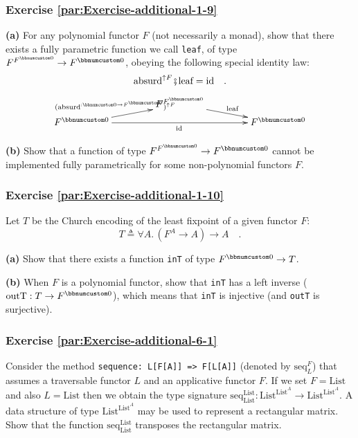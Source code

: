 \subsubsection{Exercise \label{par:Exercise-additional-1-9}\ref{par:Exercise-additional-1-9}}

\textbf{(a)} For any polynomial functor $F$ (not necessarily a monad),
show that there exists a fully parametric function we call \lstinline!leaf!,
of type $F^{F^{\bbnum 0}}\rightarrow F^{\bbnum 0}$, obeying the following
special identity law:
\[
\text{absurd}^{\uparrow F}\bef\text{leaf}=\text{id}\quad.
\]
\[
\xymatrix{\xyScaleY{0.3pc}\xyScaleX{3.5pc} & F^{F^{\bbnum 0}}\ar[rd]\sp(0.5){\ \text{leaf}}\\
F^{\bbnum 0}\ar[ru]\sp(0.5){(\text{absurd}^{:\bbnum 0\rightarrow F^{\bbnum 0}})^{\uparrow F}\ \ }\ar[rr]\sb(0.5){\text{id}\,} &  & F^{\bbnum 0}
}
\]

\textbf{(b)} Show that a function of type $F^{F^{\bbnum 0}}\rightarrow F^{\bbnum 0}$
cannot be implemented fully parametrically for some non-polynomial
functors $F$.

\subsubsection{Exercise \label{par:Exercise-additional-1-10}\ref{par:Exercise-additional-1-10}}

Let $T$ be the Church encoding of the least fixpoint of a given functor
$F$:
\[
T\triangleq\forall A.\,(F^{A}\rightarrow A)\rightarrow A\quad.
\]

\textbf{(a)} Show that there exists a function \lstinline!inT! of
type $F^{\bbnum 0}\rightarrow T$.

\textbf{(b)} When $F$ is a polynomial functor, show that \lstinline!inT!
has a left inverse ($\text{outT}:T\rightarrow F^{\bbnum 0}$), which
means that \lstinline!inT! is injective (and \lstinline!outT! is
surjective).

\subsubsection{Exercise \label{par:Exercise-additional-6-1}\ref{par:Exercise-additional-6-1}}

Consider the method \lstinline!sequence: L[F[A]] => F[L[A]]! (denoted
by $\text{seq}_{L}^{F}$) that assumes a traversable functor $L$
and an applicative functor $F$. If we set $F=\text{List}$ and also
$L=\text{List}$ then we obtain the type signature $\text{seq}_{\text{List}}^{\text{List}}:\text{List}^{\text{List}^{A}}\rightarrow\text{List}^{\text{List}^{A}}$.
A data structure of type $\text{List}^{\text{List}^{A}}$ may be used
to represent a rectangular matrix. Show that the function $\text{seq}_{\text{List}}^{\text{List}}$
transposes the rectangular matrix.

